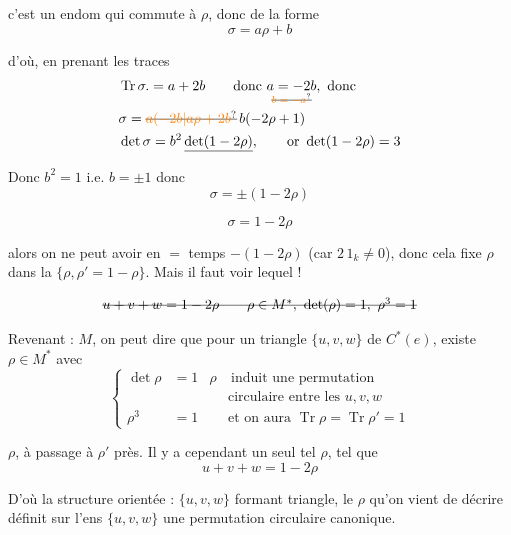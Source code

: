 c'est un endom qui commute à $\rho$, donc de la forme
\[
 \sigma=a\rho+b
\]

 d'où, en prenant les traces
\[
\begin{aligned}
 &\operatorname{Tr}\sigma.=a+2b\qquad\text{donc }\underset{\deleted{\unsure{b=-a}}}{a=-2b},\ \text{donc}\\
 &\sigma=\deleted{\unsure{a(-2b|a\rho+2b}}\,b(-2\rho+1)\\
 &\det\sigma=b^2\,\underline{\det(1-2\rho)},\qquad \text{or }\det(1-2\rho)=3
\end{aligned}
\]

Donc $b^2=1$ i.e. $b=\pm1$ donc
\[
 \sigma=\pm(1-2\rho)
\]

\[
 \sigma=1-2\rho
\]

alors on ne peut avoir en $=$ temps $-(1-2\rho)$ (car $2\,1_k\ne0$), donc cela fixe $\rho$ dans la  $\{\rho,\rho'=1-\rho\}$. Mais il faut voir lequel ! 

\[
 \deleted{u+v+w=1-2\rho\qquad \rho\in M^*,\ \det(\rho)=1,\ \rho^3=1}
\]

Revenant : $M$, on peut dire que pour un triangle $\{u,v,w\}$ de $C^*(e)$, existe $\rho\in M^*$ avec
\[
 \left\{\begin{aligned}
 \det\rho&=1&\rho&\ \text{induit une permutation}\\
 &&&\text{circulaire entre les }u,v,w\\
 \rho^3&=1&&\text{et on aura }\operatorname{Tr}\rho=\operatorname{Tr}\rho'=1
 \end{aligned}\right.
\]


 $\rho$, à passage à $\rho'$ près. Il y a cependant un seul tel $\rho$, tel que
\[
 \boxed{u+v+w=1-2\rho}
\]

D'où la structure  orientée :  $\{u,v,w\}$ formant triangle,  le $\rho$ qu'on vient de décrire définit sur l'ens $\{u,v,w\}$ une permutation circulaire canonique.

